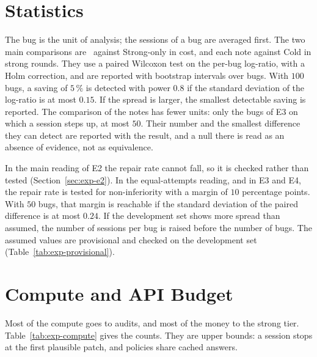 \section{Statistics}
\label{sec:exp-size}

The bug is the unit of analysis; the sessions of a bug are averaged first. The
two main comparisons are \Step\ against Strong-only in cost, and each note
against Cold in strong rounds. They use a paired Wilcoxon test on the per-bug
log-ratio, with a Holm correction, and are reported with bootstrap intervals
over bugs. With $100$ bugs, a saving of $5\,\%$ is detected with power $0.8$
if the standard deviation of the log-ratio is at most $0.15$. If the spread is
larger, the smallest detectable saving is reported. The comparison of the
notes has fewer units: only the bugs of E3 on which a session steps up, at
most $50$. Their number and the smallest difference they can detect are
reported with the result, and a null there is read as an absence of evidence,
not as equivalence.

In the main reading of E2 the repair rate cannot fall, so it is checked rather
than tested (Section~\ref{sec:exp-e2}). In the equal-attempts reading, and in
E3 and E4, the repair rate is tested for non-inferiority with a margin of $10$
percentage points. With $50$ bugs, that margin is reachable if the standard
deviation of the paired difference is at most $0.24$. If the development set
shows more spread than assumed, the number of sessions per bug is raised
before the number of bugs. The assumed values are provisional and checked on
the development set (Table~\ref{tab:exp-provisional}).

\section{Compute and API Budget}
\label{sec:exp-compute}

Most of the compute goes to audits, and most of the money to the strong tier.
Table~\ref{tab:exp-compute} gives the counts. They are upper bounds: a session
stops at the first plausible patch, and policies share cached answers.

